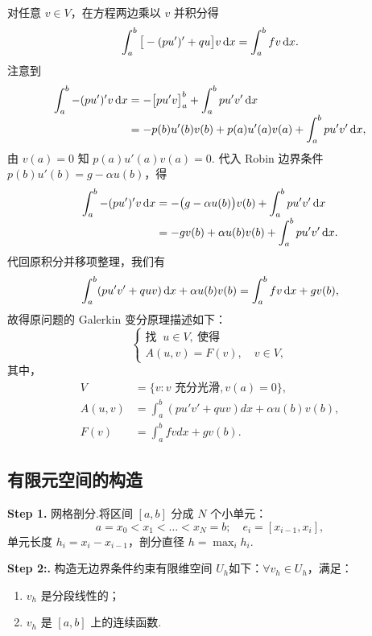 对任意 $v \in V$，在方程两边乘以 $v$ 并积分得
\begin{equation*}
    \int_a^b \big[-(pu')' + qu\big] v \mathop{}\!\mathrm{d} x = \int_a^b f v \mathop{}\!\mathrm{d} x.
\end{equation*}
注意到
\begin{align*}
    \int_a^b -(pu')'v \mathop{}\!\mathrm{d} x &= -\big[pu'v\big]_a^b + \int_a^b pu'v' \mathop{}\!\mathrm{d} x \\[-3pt]
    &= -p(b)u'(b)v(b) + p(a)u'(a)v(a) + \int_a^b pu'v' \mathop{}\!\mathrm{d} x,
\end{align*}
由 $v(a) = 0$ 知 $p(a)u'(a)v(a) = 0$. 代入 Robin 边界条件 $p(b)u'(b) = g - \alpha u(b)$，得
\begin{align*}
    \int_a^b -(pu')'v \mathop{}\!\mathrm{d} x &= -\big(g - \alpha u(b)\big)v(b) + \int_a^b pu'v' \mathop{}\!\mathrm{d} x \\[-3pt]
    &= -g v(b) + \alpha u(b)v(b) + \int_a^b pu'v' \mathop{}\!\mathrm{d} x.
\end{align*}
代回原积分并移项整理，我们有
\begin{equation*}
    \int_a^b (pu'v' + quv) \mathop{}\!\mathrm{d} x + \alpha u(b)v(b) = \int_a^b fv \mathop{}\!\mathrm{d} x + g v(b),
\end{equation*}
故得原问题的 Galerkin 变分原理描述如下：
\begin{equation*}
    \begin{cases}
        \text{找 }\ u \in V,\ \text{使得} \\
        A(u, v) = F(v), \quad v \in V,
    \end{cases}
\end{equation*}
其中，
\begin{align*}
V &= \{v : v \text{ 充分光滑}, v(a)=0\}, \\
A(u,v) &= \int_a^b (pu'v' + quv)dx + \alpha u(b)v(b), \\
F(v) &= \int_a^b fvdx + gv(b).
\end{align*}


\subsection{有限元空间的构造}

\noindent\textbf{Step 1.} 网格剖分.将区间 $[a,b]$ 分成 $N$ 个小单元：
\begin{equation*}
a = x_0 < x_1 < \dots < x_N = b; \quad e_i = [x_{i-1}, x_i],
\end{equation*}
单元长度 $h_i = x_i - x_{i-1}$，剖分直径 $h = \max_i h_i$.

\noindent\textbf{Step 2:.} 构造无边界条件约束有限维空间 $U_h$如下：$\forall v_h \in U_h$，满足：
\begin{enumerate}
  \item $v_h$ 是分段线性的；
  \item $v_h$ 是 $[a,b]$ 上的连续函数.
\end{enumerate}

